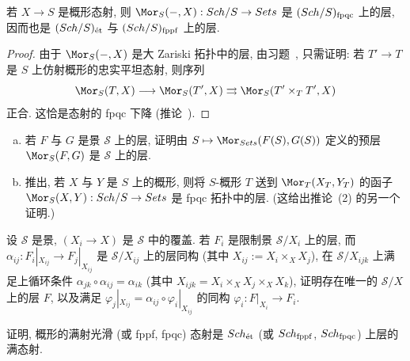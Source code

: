 \begin{proposition}[概形是层]\label{src:3.3.8}
若 $X\to S$ 是概形态射, 则 $\Mor_S(-,X):\Sch/S\to\Sets$ 是 $(Sch/S)_{\mathrm{fpqc}}$ 上的层, 因而也是 $(Sch/S)_{\text{ét}}$ 与 $(Sch/S)_{\mathrm{fppf}}$ 上的层.
\end{proposition}
\begin{proof}
由于 $\Mor_S(-,X)$ 是大 Zariski 拓扑中的层, 由习题~, 只需证明: 若 $T'\to T$ 是 $S$ 上仿射概形的忠实平坦态射, 则序列
\[
\Mor_S(T,X)\longrightarrow\Mor_S(T',X)\rightrightarrows\Mor_S(T'\times_T T',X)
\]
正合. 这恰是态射的 fpqc 下降 (推论~).
\end{proof}
\begin{exercise}\label{src:3.3.9}
\begin{enumerate}[(a)]
\item 若 $F$ 与 $G$ 是景 $\mathcal S$ 上的层, 证明由 $S\mapsto\Mor_{\Sets}(F(S),G(S))$ 定义的预层 $\Mor_{\mathcal S}(F,G)$ 是 $\mathcal S$ 上的层.
\item 推出, 若 $X$ 与 $Y$ 是 $S$ 上的概形, 则将 $S$-概形 $T$ 送到 $\Mor_T(X_T,Y_T)$ 的函子 $\Mor_S(X,Y):\Sch/S\to\Sets$ 是 fpqc 拓扑中的层. (这给出推论~(2) 的另一个证明.)
\end{enumerate}
\end{exercise}
\begin{exercise}[层的粘合]\label{src:3.3.10}
设 $\mathcal S$ 是景, $(X_i\to X)$ 是 $\mathcal S$ 中的覆盖. 若 $F_i$ 是限制景 $\mathcal S/X_i$ 上的层, 而 $\alpha_{ij}:F_i|_{X_{ij}}\to F_j|_{X_{ij}}$ 是 $\mathcal S/X_{ij}$ 上的层同构 (其中 $X_{ij}:=X_i\times_X X_j$), 在 $\mathcal S/X_{ijk}$ 上满足上循环条件 $\alpha_{jk}\circ\alpha_{ij}=\alpha_{ik}$ (其中 $X_{ijk}=X_i\times_X X_j\times_X X_k$), 证明存在唯一的 $\mathcal S/X$ 上的层 $F$, 以及满足 $\varphi_j|_{X_{ij}}=\alpha_{ij}\circ\varphi_i|_{X_{ij}}$ 的同构 $\varphi_i:F|_{X_i}\to F_i$.
\end{exercise}
\begin{exercise}\label{src:3.3.11}
证明, 概形的满射光滑 (或 fppf, fpqc) 态射是 $Sch_{\text{ét}}$ (或 $Sch_{\mathrm{fppf}}$, $Sch_{\mathrm{fpqc}}$) 上层的满态射.
\end{exercise}

